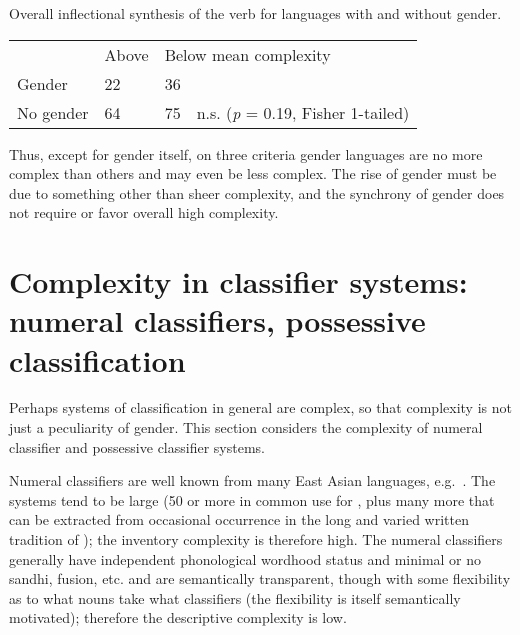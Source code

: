 \documentclass[output=collectionpaper]{langsci/langscibook}
\begin{document}
\ea
Overall inflectional synthesis of the verb for languages with and without gender.\\
\medskip
\begin{tabular}{p{2.7cm}p{1.3cm}p{1.3cm}l}
		 &	Above 	 &	\multicolumn{2}{l}{Below mean complexity} \\
	Gender	 &	22	 &	36 \\
	No gender  &	64	 &	75	 &	n.s. (\textit{p} = 0.19, Fisher 1-tailed) \\
\end{tabular}
\z

Thus, except for gender itself, on three criteria gender languages are no more complex than others and may even be less complex. The rise of gender must be due to something other than sheer complexity, and the synchrony of gender does not require or favor overall high complexity.


\section{Complexity in classifier systems: numeral classifiers, possessive classification}
\label{sec:Nich:4}

Perhaps systems of classification in general are complex, so that complexity is not just a peculiarity of gender. This section considers the complexity of numeral classifier and possessive classifier systems.

	Numeral classifiers are well known from many East Asian languages, e.g.\ . The systems tend to be large (50 or more in common use for , plus many more that can be extracted from occasional occurrence in the long and varied written tradition of ); the inventory complexity is therefore high. The numeral classifiers generally have independent phonological wordhood status and minimal or no sandhi, fusion, etc. and are semantically transparent, though with some flexibility as to what nouns take what classifiers (the flexibility is itself semantically motivated); therefore the descriptive complexity is low.
\end{document}
